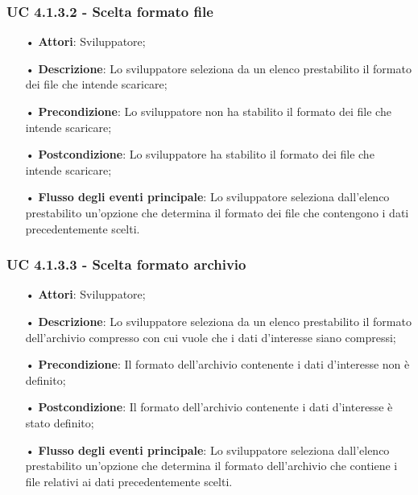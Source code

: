 \subsubsection{UC 4.1.3.2 - Scelta formato file}
\begin{itemize}
\item[•]\textbf{Attori}: Sviluppatore;
\item[•]\textbf{Descrizione}:  Lo sviluppatore seleziona da un elenco prestabilito il formato dei file che intende scaricare;
\item[•]\textbf{Precondizione}: Lo sviluppatore non ha stabilito il formato dei file che intende scaricare;
\item[•]\textbf{Postcondizione}:  Lo sviluppatore ha stabilito il formato dei file che intende scaricare;
\item[•]\textbf{Flusso degli eventi principale}:  Lo sviluppatore seleziona dall'elenco prestabilito un'opzione che determina il formato dei file che contengono i dati precedentemente scelti.
\end{itemize}

\subsubsection{UC 4.1.3.3 - Scelta formato archivio}
\begin{itemize}
\item[•]\textbf{Attori}: Sviluppatore;
\item[•]\textbf{Descrizione}: Lo sviluppatore seleziona da un elenco prestabilito il formato dell'archivio compresso con cui vuole che i dati d'interesse siano compressi;
\item[•]\textbf{Precondizione}: Il formato dell'archivio contenente i dati d'interesse non è definito;
\item[•]\textbf{Postcondizione}: Il formato dell'archivio contenente i dati d'interesse è stato definito;
\item[•]\textbf{Flusso degli eventi principale}:  Lo sviluppatore seleziona dall'elenco prestabilito un'opzione che determina il formato dell'archivio che contiene i file relativi ai dati precedentemente scelti.
\end{itemize}

